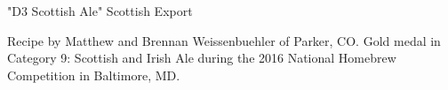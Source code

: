 \begin{recipe}{"D3 Scottish Ale" Scottish Export}

\begin{aboutblock}
Recipe by Matthew and Brennan Weissenbuehler of Parker, CO. Gold medal in
Category 9: Scottish and Irish Ale during the 2016 National Homebrew Competition
in Baltimore, MD. \sourceaha
\end{aboutblock}


\begin{methodandtiming}

\begin{mashsteps}
\end{mashsteps}

\begin{fermentationsteps}
\end{fermentationsteps}

\end{methodandtiming}

\recipebreak

\begin{ingredientsblock}

\begin{malts}
\end{malts}

\begin{hops}
\end{hops}


\end{ingredientsblock}

\end{recipe}
